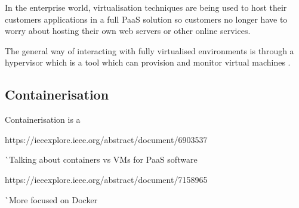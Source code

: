 In the enterprise world, virtualisation techniques are being used to host their customers applications in a full PaaS solution so customers no longer have to worry about hosting their own web servers or other online services.

The general way of interacting with fully virtualised environments is through a hypervisor which is a tool which can provision and monitor virtual machines \cite{hypervisor}.


\subsection{Containerisation}

Containerisation is a 


https://ieeexplore.ieee.org/abstract/document/6903537

^^ Talking about containers vs VMs for PaaS software

https://ieeexplore.ieee.org/abstract/document/7158965

^^ More focused on Docker

\pagebreak

